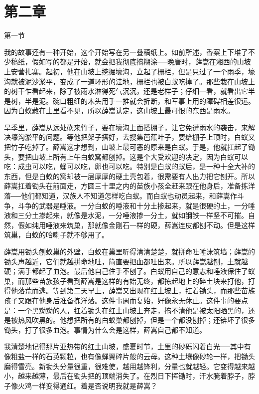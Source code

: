 \section{第二章}

第一节 

我的故事还有一种开始，这个开始写在另一叠稿纸上。如前所述，香案上下堆了不少稿纸，假如写的都是开始，就会把我彻底搞糊涂──晚唐时，薛嵩在湘西的山坡上安营扎寨。起初，他在山坡上挖掘壕沟，立起了栅栏，但是只过了一个雨季，壕沟就被泥沙淤平，变成了一道环形的洼地，栅栏也被白蚁吃掉了。那些栽在山坡上的树干乍看起来，除了被雨水淋得死气沉沉，还是老样子；仔细一看，就看出它半是树，半是泥。碗口粗细的木头用手一推就会折断，和军事上用的障碍相差很远。因为白蚁藏在土里看不见，所以薛嵩认定，这山坡上最可恨的东西是雨水。 

旱季里，薛嵩从远处砍来竹子，要在壕沟上面搭棚子，让它免遭雨水的袭击，来解决壕沟淤平的问题。等他把架子搭好，去搜集芭蕉叶子，要给棚子上顶时，白蚁又把竹子吃掉了。薛嵩这才想到，山坡上最可恶的原来是白蚁。于是，他就扛起了锄头，要把山坡上所有上午白蚁窝都刨掉。这是个大受欢迎的决定，因为白蚁可以吃：成虫可以吃，蛹可以吃，卵也可以吃。特别是白蚁的蚁后，是一种十全大补的东西，但是白蚁的窝却被一层厚厚的硬土壳包着，很需要有人出力把它刨开。所以薛嵩扛着锄头在前面走，方圆三十里之内的苗族小孩全赶来跟在他身后，准备拣洋落──他们都知道，汉族人不知道怎样吃白蚁。而白蚁也动员起来，和薛嵩作斗争，斗争的武器是唾液。一分白蚁的唾液和十分土掺起来，就是很硬的土，一分唾液和三分土掺起来，就像是水泥，一分唾液掺一分土，就如钢铁一样坚不可摧。自然，假如纯用唾液来筑巢，那就像金刚石一样的硬，薛嵩连皮都刨不动。但是这样筑巢，白蚁的哈喇子就不够用了。 

薛嵩用锄头刨蚁巢的外壁，白蚁在巢里听得清清楚楚，就拼命吐唾沫筑墙；薛嵩的锄头声越近，它们就越拼命地吐，简直要把血都吐出来。所以薛嵩越刨，土就越硬；满手都起了血泡。最后他自己住手不刨了。白蚁用自己的意志和唾液保住了蚁巢，而那些苗族孩子看到薛嵩是这样的有始无终，都拣起地上的碎土块来打他，打得他落荒而逃。等到第二天早上，薛嵩又出现在红土坡上，扛着锄头，而那些苗族孩子又跟在他身后准备拣洋落。这件事周而复始，好像永无休止。这件事的要点是：一个黑黝黝的人，扛着锄头在红土山坡上奔走，搞不清他是被太阳晒黑的，还是被热风吹黑的。他想把所有的白蚁巢都刨掉，但是一个都没刨掉；还锛坏了很多锄头，打了很多血泡。事情为什么会是这样，薛嵩自己都不知道。 

我清楚地记得那片亚热带的红土山坡，盛夏时节，土里的砂砾闪着白光──其中有像粗盐一样的石英颗粒，也有像蝉翼碎片般的云母。这种土壤像砂轮一样，把锄头磨得雪亮。新锄头分量很重，很难使，越用越锋利，分量也就越轻。它变得越来越小，越来越薄，最后在锄头把的顶端消失了。在烈日下挥锄时，汗水腌着脖子，脖子像火鸡一样变得通红。着是否说明我就是薛嵩？ 


